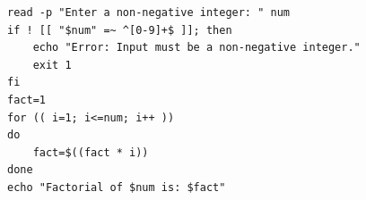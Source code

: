 \begin{verbatim}
read -p "Enter a non-negative integer: " num
if ! [[ "$num" =~ ^[0-9]+$ ]]; then
    echo "Error: Input must be a non-negative integer."
    exit 1
fi
fact=1
for (( i=1; i<=num; i++ ))
do
    fact=$((fact * i))
done
echo "Factorial of $num is: $fact"
\end{verbatim}